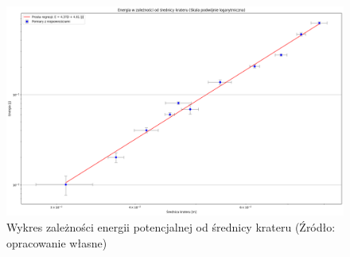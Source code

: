 \documentclass[a4paper,12pt]{article}
\begin{document}
\begin{figure}[H]
    \centering
    \includegraphics[angle=90,height=0.90\textheight]{energia_od_srednicy.png}
    \caption{Wykres zależności energii potencjalnej od średnicy krateru (Źródło: opracowanie własne)}
    \label{rys:energia_od_srednicy}
\end{figure}



\end{document}
